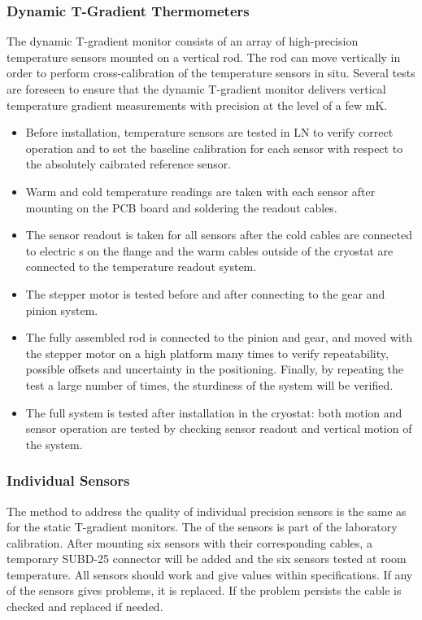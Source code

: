 \subsubsection{Dynamic T-Gradient Thermometers}
\label{sec:fdgen-slow-cryo-qc-thdy}

The dynamic T-gradient monitor consists of an array of high-precision temperature sensors mounted on a vertical rod. The rod can move vertically in order to perform cross-calibration of the temperature sensors in situ. Several tests are foreseen to ensure that the dynamic T-gradient monitor delivers vertical temperature gradient measurements with precision at the level of a few \si{mK}.

\begin{itemize}
\item
Before installation, temperature sensors are tested in LN to verify correct operation and to set the baseline calibration for each sensor with respect to the absolutely caibrated reference sensor. 
\item
Warm and cold temperature readings are taken with each sensor after mounting on the PCB board and soldering %
the readout cables.
\item
The sensor readout is taken for all sensors after the cold cables are connected to electric \fdth{}s on the flange and the warm cables outside of the cryostat are connected to the temperature readout system.
\item 
The stepper motor is tested before and after connecting to the gear and pinion system.
\item
The fully assembled rod is connected to the pinion and gear, and moved with the stepper motor on a high platform many times to verify repeatability, possible offsets and uncertainty in the positioning. Finally, by repeating the test a large number of times, the sturdiness of the system will be verified.
\item
The full system is tested after installation in the cryostat: both motion and sensor operation are tested by checking %
sensor readout and vertical motion of the system.
\end{itemize} 

\subsubsection{Individual Sensors}
\label{sec:fdgen-slow-cryo-qc-is}

The method to address the quality of individual precision sensors is the same as for the static T-gradient monitors.
The  of the sensors is part of the laboratory calibration. After mounting six sensors with their corresponding cables, a
temporary SUBD-25 connector will be added and the six sensors tested at room temperature. All sensors should work and give values within specifications.  
If any of the sensors gives problems, it is replaced.  If the problem persists the cable is checked and replaced if needed.

